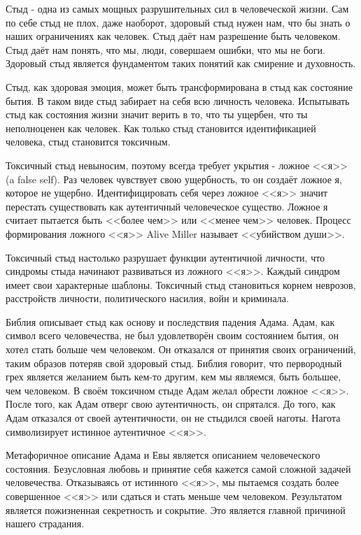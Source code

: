 \documentclass[10pt, fleqn]{article}
\begin{document}
Стыд - одна из самых мощных разрушительных сил в человеческой жизни.
Сам по себе стыд не плох, даже наоборот, здоровый стыд нужен нам, что бы знать о наших ограничениях как человек. Стыд даёт нам разрешение быть человеком. Стыд даёт нам понять, что мы, люди, совершаем ошибки, что мы не боги. Здоровый стыд является фундаментом таких понятий как смирение и духовность.


Стыд, как здоровая эмоция, может быть трансформирована в стыд как состояние бытия. В таком виде стыд забирает на себя всю личность человека. Испытывать стыд как состояния жизни значит верить в то, что ты ущербен, что ты неполноценен как человек. Как только стыд становится идентификацией человека, стыд становится токсичным.

Токсичный стыд невыносим, поэтому всегда требует укрытия - ложное <<я>> (a false self). Раз человек чувствует свою ущербность, то он создаёт ложное я, которое не ущербно. Идентифицировать себя через ложное <<я>> значит перестать существовать как аутентичный человеческое существо. Ложное я считает пытается быть <<более чем>> или <<менее чем>> человек. Процесс формирования ложного <<я>> Alive Miller называет <<убийством души>>. 

Токсичный стыд настолько разрушает функции аутентичной личности, что синдромы стыда начинают развиваться из ложного <<я>>. Каждый синдром имеет свои характерные шаблоны. Токсичный стыд становиться корнем неврозов, расстройств личности, политического насилия, войн и криминала.

Библия описывает стыд как основу и последствия падения Адама. Адам, как символ всего человечества, не был удовлетворён своим состоянием бытия, он хотел стать больше чем человеком. Он отказался от принятия своих ограничений, таким образов потеряв свой здоровый стыд. Библия говорит, что первородный грех является желанием быть кем-то другим, кем мы являемся, быть большее, чем человеком. В своём токсичном стыде Адам желал обрести ложное <<я>>.
После того, как Адам отверг свою аутентичность, он спрятался. До того, как Адам отказался от своей аутентичности, он не стыдился своей наготы.
Нагота символизирует истинное аутентичное <<я>>.

Метафоричное описание Адама и Евы является описанием человеческого состояния. Безусловная любовь и принятие себя кажется самой сложной задачей человечества. Отказываясь от истинного <<я>>, мы пытаемся создать более совершенное <<я>> или сдаться и стать меньше чем человеком. Результатом является пожизненная секретность и сокрытие. Это является главной причиной нашего страдания.
\end{document}
